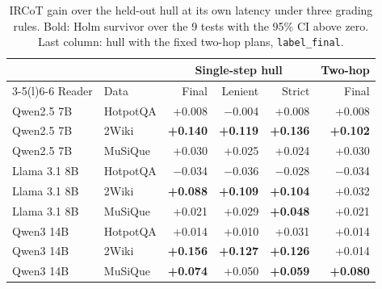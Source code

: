 \begin{table}[t]
\centering\footnotesize
\setlength{\tabcolsep}{3pt}
\caption{IRCoT gain over the held-out hull at its own latency under three grading rules. Bold: Holm survivor over the 9 tests with the 95\% CI above zero. Last column: hull with the fixed two-hop plans, \texttt{label\_final}.}
\label{tab:p_h3rules}
\begin{tabular*}{\linewidth}{@{\extracolsep{\fill}}llrrrr@{}}
\toprule
 & & \multicolumn{3}{c}{Single-step hull} & Two-hop \\
\cmidrule(lr){3-5}\cmidrule(l){6-6}
Reader & Data & Final & Lenient & Strict & Final \\
\midrule
Qwen2.5 7B & HotpotQA & +0.008 & $-$0.004 & +0.008 & +0.008 \\
Qwen2.5 7B & 2Wiki & \textbf{+0.140} & \textbf{+0.119} & \textbf{+0.136} & \textbf{+0.102} \\
Qwen2.5 7B & MuSiQue & +0.030 & +0.025 & +0.024 & +0.030 \\
Llama 3.1 8B & HotpotQA & $-$0.034 & $-$0.036 & $-$0.028 & $-$0.034 \\
Llama 3.1 8B & 2Wiki & \textbf{+0.088} & \textbf{+0.109} & \textbf{+0.104} & +0.032 \\
Llama 3.1 8B & MuSiQue & +0.021 & +0.029 & \textbf{+0.048} & +0.021 \\
Qwen3 14B & HotpotQA & +0.014 & +0.010 & +0.031 & +0.014 \\
Qwen3 14B & 2Wiki & \textbf{+0.156} & \textbf{+0.127} & \textbf{+0.126} & +0.014 \\
Qwen3 14B & MuSiQue & \textbf{+0.074} & +0.050 & \textbf{+0.059} & \textbf{+0.080} \\
\bottomrule
\end{tabular*}
\end{table}
